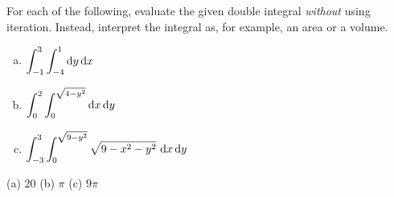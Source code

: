 


\subsection*{\Conceptual}


\begin{question}
For each of the following, evaluate the given double integral 
\emph{without} using iteration. Instead, interpret the integral as, for
example, an area or a volume.
\begin{enumerate}[(a)]
\item
$\displaystyle\int_{-1}^3\int_{-4}^1 \mathrm{d}y\,\mathrm{d}x$
\item
$\displaystyle\int_0^2\int_0^{\sqrt{4-y^2}} \mathrm{d}x\,\mathrm{d}y$
\item
$\dst\int_{-3}^3\int_0^{\sqrt{9-y^2}}\sqrt{9-x^2-y^2}\ \dee{x}\,\dee{y}$
\end{enumerate}
\end{question}

%

\begin{answer}
(a) $20$\qquad
(b) $\pi$  \qquad
(c) $9\pi$
\end{answer}

